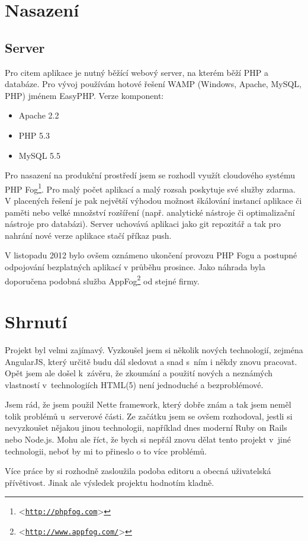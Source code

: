 \documentclass[11pt,twoside,a4paper]{book}
\let\oldUrl\url									%
\renewcommand\url[1]{<\texttt{\oldUrl{#1}}>}
\begin{document}
\chapter{Nasazení}

\section{Server}
Pro citem aplikace je nutný běžící webový server, na kterém běží PHP a databáze. Pro vývoj používám hotové řešení WAMP (Windows, Apache, MySQL, PHP) jménem EasyPHP. Verze komponent:

\begin{itemize}
	\item Apache 2.2
	\item PHP 5.3
	\item MySQL 5.5
\end{itemize}

Pro nasazení na produkční prostředí jsem se rozhodl využít cloudového systému PHP Fog\footnote{\url{http://phpfog.com}}. Pro malý počet aplikací a malý rozsah poskytuje své služby zdarma. V placených řešení je pak největší výhodou možnost škálování instancí aplikace či paměti nebo velké množství rozšíření (např. analytické nástroje či optimalizační nástroje pro databázi). Server uchovává aplikaci jako git repozitář a tak pro nahrání nové verze aplikace stačí příkaz push.

V listopadu 2012 bylo ovšem oznámeno ukončení provozu PHP Fogu a postupné odpojování bezplatných aplikací v průběhu prosince. Jako náhrada byla doporučena podobná služba AppFog\footnote{\url{http://www.appfog.com/}} od stejné firmy.



\chapter{Shrnutí}
Projekt byl velmi zajímavý. Vyzkoušel jsem si několik nových technologií, zejména AngularJS, který určitě budu dál sledovat a snad s~ním i někdy znovu pracovat. Opět jsem ale došel k~závěru, že zkoumání a použití nových a neznámých vlastností v~technologiích HTML(5) není jednoduché a bezproblémové.

Jsem rád, že jsem použil Nette framework, který dobře znám a tak jsem neměl tolik problémů u~serverové části. Ze začátku jsem se ovšem rozhodoval, jestli si nevyzkoušet nějakou jinou technologii, například dnes moderní Ruby on Rails nebo Node.js. Mohu ale říct, že bych si nepřál znovu dělat tento projekt v~jiné technologii, neboť by mi to přineslo o to více problémů.

Více práce by si rozhodně zasloužila podoba editoru a obecná uživatelská přívětivost. Jinak ale výsledek projektu hodnotím kladně.

{}

\end{document}
